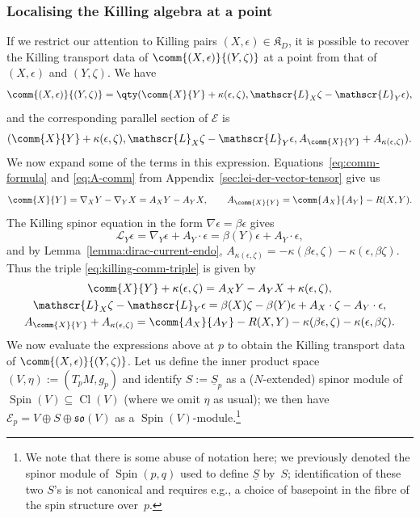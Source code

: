 \documentclass[pdftex]{sigma}
\numberwithin{equation}{section}
\newcommand{\fso}{\mathfrak{so}}
\newcommand{\fK}{\mathfrak{K}}
\newcommand{\eE}{\mathscr{E}}
\newcommand{\eL}{\mathscr{L}}
\newcommand{\Sbundle}{\underline{S}}
\newcommand{\1}{\mathbbm{1}}
\DeclareMathOperator{\Spin}{Spin}
\DeclareMathOperator{\Cl}{Cl}
\begin{document}
\subsubsection{Localising the Killing algebra at a point}

If we restrict our attention to Killing pairs $(X,\epsilon)\in\fK_D$, it is possible to recover the Killing transport data of $\comm{(X,\epsilon)}{(Y,\zeta)}$ at a point from that of $(X,\epsilon)$ and $(Y,\zeta)$. We have
\[
	\comm{(X,\epsilon)}{(Y,\zeta)} = \qty(\comm{X}{Y} + \kappa(\epsilon,\zeta),\eL_X\zeta - \eL_Y\epsilon),
\]
and the corresponding parallel section of $\eE$ is
\begin{equation}\label{eq:killing-comm-triple}
	(\comm{X}{Y} + \kappa(\epsilon,\zeta),\eL_X\zeta - \eL_Y\epsilon,A_{\comm{X}{Y}} + A_{\kappa(\epsilon,\zeta)}).
\end{equation}
We now expand some of the terms in this expression. Equations~\eqref{eq:comm-formula} and \eqref{eq:A-comm} from Appendix~\ref{sec:lei-der-vector-tensor} give us
\[
	\comm{X}{Y} = \nabla_X Y - \nabla_Y X = A_X Y - A_Y X,\qquad
	A_{\comm{X}{Y}} = \comm{A_X}{A_Y} - R(X,Y).
\]
The Killing spinor equation in the form $\nabla \epsilon = \beta\epsilon$ gives
\[
	\eL_Y\epsilon = \nabla_Y\epsilon + A_Y\cdot\epsilon = \beta(Y)\epsilon + A_Y\cdot\epsilon,
\]
and by Lemma~\ref{lemma:dirac-current-endo},
$
	A_{\kappa(\epsilon,\zeta)} = - \kappa(\beta\epsilon,\zeta) - \kappa(\epsilon,\beta\zeta)$.
Thus the triple \eqref{eq:killing-comm-triple} is given by
\begin{gather*}
	\comm{X}{Y} + \kappa(\epsilon,\zeta) = A_X Y - A_Y X + \kappa(\epsilon,\zeta),\\
	\eL_X\zeta - \eL_Y\epsilon = \beta(X)\zeta - \beta(Y)\epsilon + A_X\cdot\zeta - A_Y\cdot\epsilon,\\
	A_{\comm{X}{Y}} + A_{\kappa(\epsilon,\zeta)} = \comm{A_X}{A_Y} - R(X,Y) - \kappa(\beta\epsilon,\zeta) - \kappa(\epsilon,\beta\zeta).
\end{gather*}
We now evaluate the expressions above at $p$ to obtain the Killing transport data of $\comm{(X,\epsilon)}{(Y,\zeta)}$. Let us define the inner product space $(V,\eta):=(T_pM,g_p)$ and identify $S:=\Sbundle_p$ as a ($N$-extended) spinor module of $\Spin(V)\subseteq\Cl(V)$ (where we omit $\eta$ as usual); we then have $\eE_p = V\oplus S\oplus\fso(V)$ as a $\Spin(V)$-module.\footnote{We note that there is some abuse of notation here; we previously denoted the spinor module of $\Spin(p,q)$ used to define $\Sbundle$ by~$S$; identification of these two $S$'s is not canonical and requires e.g., a choice of basepoint in the fibre of the spin structure over~$p$.}
\end{document}
